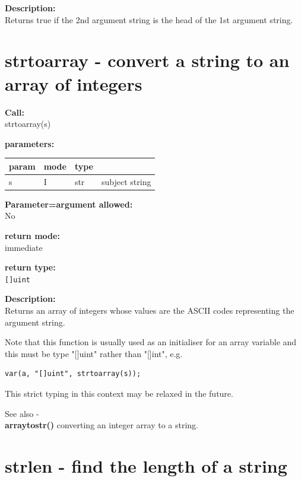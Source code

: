         {\bf Description:} \\
        Returns true if the 2nd argument string is the head
        of the 1st argument string.


    \section{strtoarray - convert a string to an array of integers}\label{sec:ifstrtoarray}
        
        {\bf Call:} \\
        strtoarray(s)
        
        {\bf parameters:} \\
        \begin{tabular}{| l | l | l | l |}
        \hline
        param  & mode & type & \\
        \hline \hline
        s & I & str & subject string   \\ \hline
        \end{tabular}
        
        {\bf Parameter=argument allowed:} \\
        No
        
        {\bf return mode:} \\
        immediate

        {\bf return type:} \\
        \verb'[]uint'
        
        {\bf Description:} \\
        Returns an array of integers whose values are the ASCII codes
        representing the argument string.
        
        Note that this function is usually used as an initialiser for an array
        variable and this must be type "[]uint" rather than "[]int", e.g.
        \begin{lstlisting}[gobble=8, language=threepl]
           var(a, "[]uint", strtoarray(s));
        \end{lstlisting}
        This strict typing in this context may be relaxed in the future.

        See also - \\
         {\bf arraytostr()} converting
        an integer array to a string.


    \section{strlen - find the length of a string}\label{sec:ifstrlen}
        
